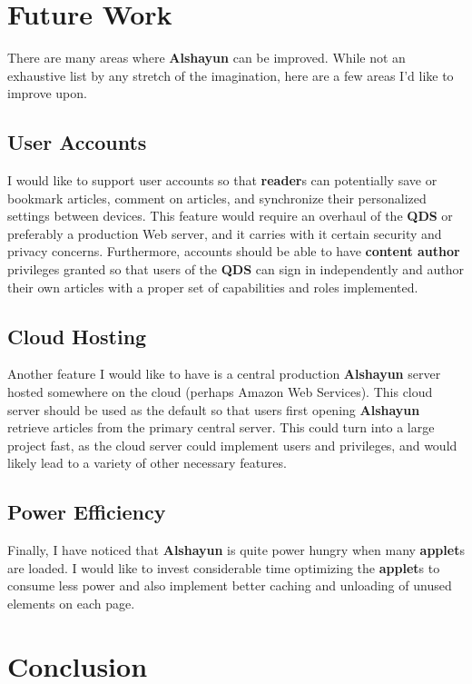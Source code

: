 \documentclass[12pt]{report}
\begin{document}
\chapter{Future Work}

There are many areas where \textbf{Alshayun} can be improved. While not an
exhaustive list by any stretch of the imagination, here are a few areas I'd like
to improve upon.

    \section{User Accounts}

I would like to support user accounts so that \textbf{reader}s can potentially
save or bookmark articles, comment on articles, and synchronize their
personalized settings between devices. This feature would require an overhaul of
the \textbf{QDS} or preferably a production Web server, and it carries with it
certain security and privacy concerns. Furthermore, accounts should be able to
have \textbf{content author} privileges granted so that users of the
\textbf{QDS} can sign in independently and author their own articles with a
proper set of capabilities and roles implemented.

    \section{Cloud Hosting}

Another feature I would like to have is a central production \textbf{Alshayun}
server hosted somewhere on the cloud (perhaps Amazon Web Services). This cloud
server should be used as the default so that users first opening
\textbf{Alshayun} retrieve articles from the primary central server. This could
turn into a large project fast, as the cloud server could implement users and
privileges, and would likely lead to a variety of other necessary features.

    \section{Power Efficiency}

Finally, I have noticed that \textbf{Alshayun} is quite power hungry when many
\textbf{applet}s are loaded. I would like to invest considerable time optimizing
the \textbf{applet}s to consume less power and also implement better caching and
unloading of unused elements on each page.

\chapter{Conclusion}
\end{document}
